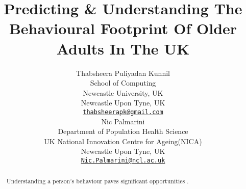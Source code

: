 \documentclass{article}
\title{Predicting \& Understanding The Behavioural Footprint Of Older
Adults In The UK}
\author{
    Thabsheera Puliyadan Kunnil
   \\
    School of Computing \\
    Newcastle University, UK \\
  Newcastle Upon Tyne, UK \\
  \texttt{\href{mailto:thabsheerapk@gmail.com}{\nolinkurl{thabsheerapk@gmail.com}}} \\
   \And
    Nic Palmarini
   \\
    Department of Population Health Science \\
    UK National Innovation Centre for Ageing(NICA) \\
  Newcastle Upon Tyne, UK \\
  \texttt{\href{mailto:Nic.Palmarini@ncl.ac.uk}{\nolinkurl{Nic.Palmarini@ncl.ac.uk}}} \\
  }
\begin{document}
\maketitle

\def\tightlist{}


\begin{abstract}
Understanding a person's behaviour paves significant opportunities .
\end{abstract}






\end{document}
